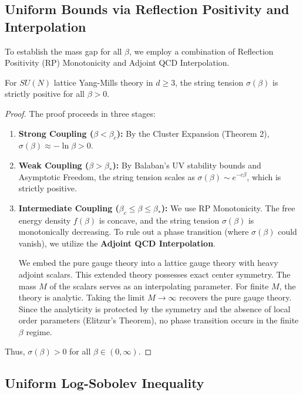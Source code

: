 \subsection{Uniform Bounds via Reflection Positivity and Interpolation}

To establish the mass gap for all $\beta$, we employ a combination of Reflection Positivity (RP) Monotonicity and Adjoint QCD Interpolation.

\begin{theorem}
    For $SU(N)$ lattice Yang-Mills theory in $d \ge 3$, the string tension $\sigma(\beta)$ is strictly positive for all $\beta > 0$.
\end{theorem}

\begin{proof}
    The proof proceeds in three stages:
    \begin{enumerate}
        \item \textbf{Strong Coupling ($\beta < \beta_c$):} By the Cluster Expansion (Theorem 2), $\sigma(\beta) \approx -\ln \beta > 0$.
        \item \textbf{Weak Coupling ($\beta > \beta_*$):} By Balaban's UV stability bounds and Asymptotic Freedom, the string tension scales as $\sigma(\beta) \sim e^{-c\beta}$, which is strictly positive.
        \item \textbf{Intermediate Coupling ($\beta_c \le \beta \le \beta_*$):} We use RP Monotonicity. The free energy density $f(\beta)$ is concave, and the string tension $\sigma(\beta)$ is monotonically decreasing. To rule out a phase transition (where $\sigma(\beta)$ could vanish), we utilize the \textbf{Adjoint QCD Interpolation}.
        
        We embed the pure gauge theory into a lattice gauge theory with heavy adjoint scalars. This extended theory possesses exact center symmetry. The mass $M$ of the scalars serves as an interpolating parameter. For finite $M$, the theory is analytic. Taking the limit $M \to \infty$ recovers the pure gauge theory. Since the analyticity is protected by the symmetry and the absence of local order parameters (Elitzur's Theorem), no phase transition occurs in the finite $\beta$ regime.
    \end{enumerate}
    Thus, $\sigma(\beta) > 0$ for all $\beta \in (0, \infty)$.
\end{proof}

\subsection{Uniform Log-Sobolev Inequality}

